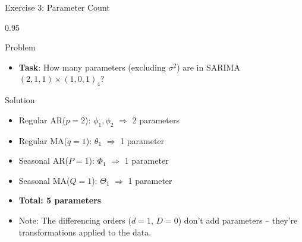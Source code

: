 \documentclass[9pt, aspectratio=169, t]{beamer}
\begin{document}
\begin{frame}{Exercise 3: Parameter Count}
    \begin{cminipage}{0.95\textwidth}
    \begin{alertblock}{Problem}
        \begin{itemize}\setlength{\itemsep}{0pt}
            \item \textbf{Task}: How many parameters (excluding $\sigma^2$) are in SARIMA$(2,1,1) \times (1,0,1)_4$?
        \end{itemize}
    \end{alertblock}

    \vspace{0.2cm}
    \begin{exampleblock}{Solution}
        \begin{itemize}\setlength{\itemsep}{0pt}
            \item Regular AR($p=2$): $\phi_1, \phi_2$ $\Rightarrow$ 2 parameters
            \item Regular MA($q=1$): $\theta_1$ $\Rightarrow$ 1 parameter
            \item Seasonal AR($P=1$): $\Phi_1$ $\Rightarrow$ 1 parameter
            \item Seasonal MA($Q=1$): $\Theta_1$ $\Rightarrow$ 1 parameter
            \item \textbf{Total: 5 parameters}
            \item Note: The differencing orders ($d=1$, $D=0$) don't add parameters -- they're transformations applied to the data.
        \end{itemize}
    \end{exampleblock}
    \end{cminipage}
\end{frame}
\end{document}
